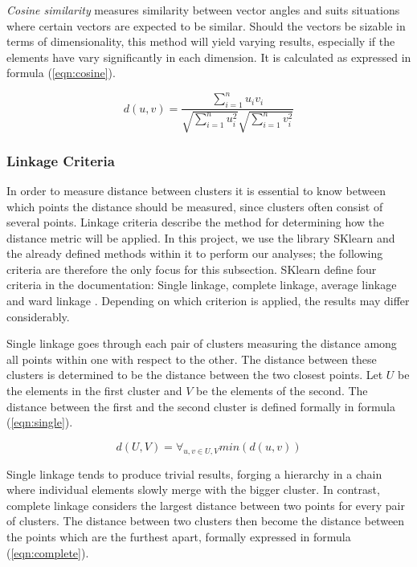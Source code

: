 \textit{Cosine similarity} measures similarity between vector angles and suits situations where certain vectors are expected to be similar. Should the vectors be sizable in terms of dimensionality, this method will yield varying results, especially if the elements have vary significantly in each dimension. It is calculated as expressed in formula (\ref{eqn:cosine}).

\begin{equation}
\label{eqn:cosine}
d(u, v) = \frac{\sum_{i=1}^n u_iv_i}{\sqrt{\sum_{i=1}^n u_i^2}\sqrt{\sum_{i=1}^n v_i^2}}
\end{equation}

\subsubsection{Linkage Criteria}
In order to measure distance between clusters it is essential to know between which points the distance should be measured, since clusters often consist of several points. Linkage criteria describe the method for determining how the distance metric will be applied. In this project, we use the library SKlearn and the already defined methods within it to perform our analyses; the following criteria are therefore the only focus for this subsection. SKlearn define four criteria in the documentation: Single linkage, complete linkage, average linkage and ward linkage \cite{scikit}. Depending on which criterion is applied, the results may differ considerably.

Single linkage goes through each pair of clusters measuring the distance among all points within one with respect to the other. The distance between these clusters is determined to be the distance between the two closest points. Let $U$ be the elements in the first cluster and $V$ be the elements of the second. The distance between the first and the second cluster is defined formally in formula (\ref{eqn:single}).

\begin{equation}
\label{eqn:single}
d(U, V) = \forall_{u, v \in U, V} min(d(u, v))
\end{equation}

Single linkage tends to produce trivial results, forging a hierarchy in a chain where individual elements slowly merge with the bigger cluster. In contrast, complete linkage considers the largest distance between two points for every pair of clusters. The distance between two clusters then become the distance between the points which are the furthest apart, formally expressed in formula (\ref{eqn:complete}).

